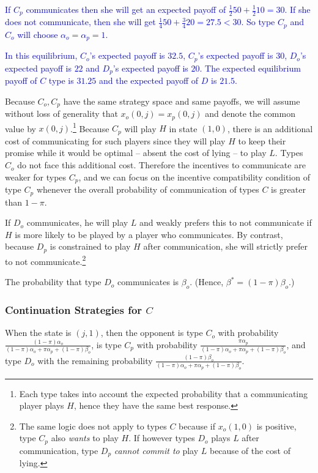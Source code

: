 \documentclass[12pt]{article}
\theoremstyle{break}
\begin{document}
\textcolor{blue}{If $C_p$ communicates then she will get an expected payoff of $\frac{1}{2}50+\frac{1}{2}10=30$. If she does not communicate, then she will get $\frac{1}{4}50+\frac{3}{4}20=27.5<30$. So type $C_p$ and $C_o$ will choose $\alpha_o=\alpha_p=1$.}

\textcolor{blue}{In this equilibrium, $C_o$'s expected payoff is $32.5$, $C_p$'s expected payoff is $30$, $D_o$'s expected payoff is $22$ and $D_p$'s expected payoff is $20$. The expected equilibrium payoff of $C$ type is $31.25$ and the expected payoff of $D$ is $21.5$.}

Because $C_o,C_p$ have the same strategy space and same payoffs, we will assume without loss of generality that $x_o(0,j)=x_p(0,j)$ and denote the common value by $x(0,j)$.\footnote{%
Each type takes into account the expected probability that a communicating player plays $H$, hence they have the same best response.
} Because $C_p$ will play $H$ in state $(1,0)$, there is an additional cost of communicating for such players since they will play $H$ to keep their promise while it would be optimal -- absent the cost of lying -- to play $L$. Types $C_o$ do not face this additional cost. Therefore the incentives to communicate are weaker for types $C_p$, and we can focus on the incentive compatibility condition of type $C_p$ whenever the overall probability of communication of types $C$ is greater than $1-\pi$.


If $D_o$ communicates, he will play $L$ and weakly prefers this to not communicate if $H$ is more likely to be played by a player who communicates. By contrast, because $D_p$ is constrained to play $H$ after communication, she will strictly prefer to not communicate.\footnote{%
The same logic does not apply to types $C$ because if $x_o(1,0)$ is positive, type $C_p$ also \emph{wants} to play $H$. If however types $D_o$ plays $L$ after communication, type $D_p$ \emph{cannot commit to} play $L$ because of the cost of lying.} 


The probability that type $D_o$ communicates is $\beta_o$. (Hence, $\beta^*=(1-\pi)\beta_o$.)
%
\subsubsection*{Continuation Strategies for $C$}
When the state is $(j,1)$, then the opponent is type $C_o$ with probability $\frac{(1-\pi)\alpha_o}{(1-\pi)\alpha_o+\pi\alpha_p+(1-\pi)\beta_o}$, is type $C_p$ with probability $\frac{\pi\alpha_p}{(1-\pi)\alpha_o+\pi\alpha_p+(1-\pi)\beta_o}$, and type $D_o$ with the remaining probability $\frac{(1-\pi)\beta_o}{(1-\pi)\alpha_o+\pi\alpha_p+(1-\pi)\beta_o}$.
\end{document}
